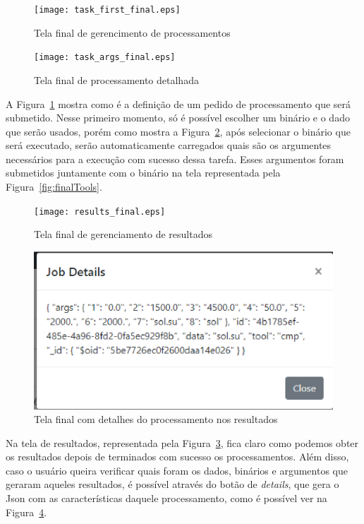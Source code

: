 \documentclass[11pt,twoside]{article}
\begin{document}
\begin{figure}[!h]
  \centering
  \texttt{[image: task\_first\_final.eps]}
  \caption{Tela final de gerencimento de processamentos}
  \label{fig:finalTasks}
\end{figure}

\begin{figure}[!h]
  \centering
  \texttt{[image: task\_args\_final.eps]}
  \caption{Tela final de processamento detalhada}
  \label{fig:finalDetailedTask}
\end{figure}

A Figura~\ref{fig:finalTasks} mostra como é a definição de um pedido de processamento que será submetido. Nesse primeiro momento, só é possível escolher um binário e o dado que serão usados, porém como mostra 
a Figura~\ref{fig:finalDetailedTask}, após selecionar o binário que será executado, serão automaticamente carregados quais são os argumentes necessários para a execução com sucesso dessa tarefa. Esses argumentos
foram submetidos juntamente com o binário na tela representada pela Figura~\ref{fig:finalTools}.

\begin{figure}[!h]
  \centering
  \texttt{[image: results\_final.eps]}
  \caption{Tela final de gerenciamento de resultados}
  \label{fig:finalResults}
\end{figure}

\begin{figure}[!h]
  \centering
  \includegraphics[scale=0.6]{results_detail_final.eps}
  \caption{Tela final com detalhes do processamento nos resultados}
  \label{fig:finalResultsDetail}
\end{figure}

Na tela de resultados, representada pela Figura~\ref{fig:finalResults}, fica claro como podemos obter os resultados depois de terminados com sucesso os processamentos. Além disso, caso o usuário queira verificar 
quais foram os dados, binários e argumentos que geraram aqueles resultados, é possível através do botão de \emph{details}, que gera o Json com as características daquele processamento, como é possível ver na 
Figura~\ref{fig:finalResultsDetail}.
\end{document}
